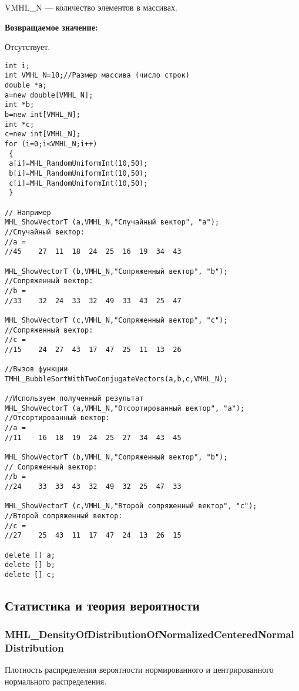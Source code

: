 \documentclass[a4paper,12pt]{article}
\begin{document}
VMHL\_N --- количество элементов в массивах.

\textbf{Возвращаемое значение:}

Отсутствует.


\begin{lstlisting}[label=code_use_TMHL_BubbleSortWithTwoConjugateVectors,caption=Пример использования]
int i;
int VMHL_N=10;//Размер массива (число строк)
double *a;
a=new double[VMHL_N];
int *b;
b=new int[VMHL_N];
int *c;
c=new int[VMHL_N];
for (i=0;i<VMHL_N;i++)
 {
 a[i]=MHL_RandomUniformInt(10,50);
 b[i]=MHL_RandomUniformInt(10,50);
 c[i]=MHL_RandomUniformInt(10,50);
 }

// Например
MHL_ShowVectorT (a,VMHL_N,"Случайный вектор", "a");
//Случайный вектор:
//a =
//45	27	11	18	24	25	16	19	34	43

MHL_ShowVectorT (b,VMHL_N,"Сопряженный вектор", "b");
//Сопряженный вектор:
//b =
//33	32	24	33	32	49	33	43	25	47

MHL_ShowVectorT (c,VMHL_N,"Сопряженный вектор", "c");
//Сопряженный вектор:
//c =
//15	24	27	43	17	47	25	11	13	26

//Вызов функции
TMHL_BubbleSortWithTwoConjugateVectors(a,b,c,VMHL_N);

//Используем полученный результат
MHL_ShowVectorT (a,VMHL_N,"Отсортированный вектор", "a");
//Отсортированный вектор:
//a =
//11	16	18	19	24	25	27	34	43	45

MHL_ShowVectorT (b,VMHL_N,"Сопряженный вектор", "b");
// Сопряженный вектор:
//b =
//24	33	33	43	32	49	32	25	47	33

MHL_ShowVectorT (c,VMHL_N,"Второй сопряженный вектор", "c");
//Второй сопряженный вектор:
//c =
//27	25	43	11	17	47	24	13	26	15

delete [] a;
delete [] b;
delete [] c;
\end{lstlisting}

\subsection{Статистика и теория вероятности}

\subsubsection{MHL\_DensityOfDistributionOfNormalizedCenteredNormalDistribution}\label{MHL_DensityOfDistributionOfNormalizedCenteredNormalDistribution}

Плотность распределения вероятности нормированного и центрированного нормального распределения.
\end{document}
